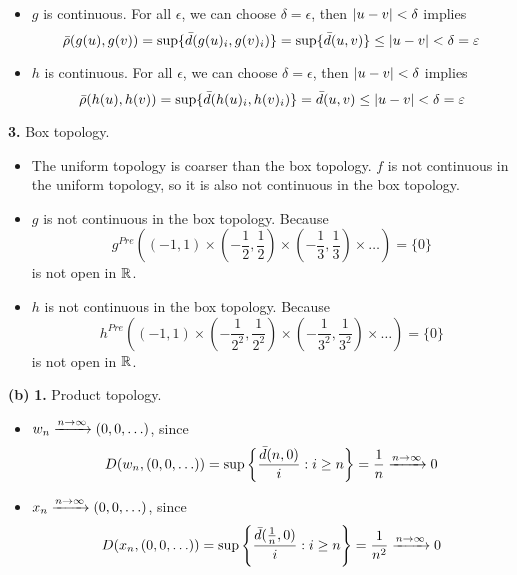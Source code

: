 \documentclass[a4paper, 12pt]{article}
\begin{document}
\begin{solution}
\begin{itemize}
\item $g$ is continuous. For all $\epsilon$, we can choose $\delta = \epsilon$, then $\lvert u - v\rvert < \delta$ implies \begin{equation*}
\bar{\rho}(g(u), g(v)) = \sup\{\bar{d} (g(u)_i, g(v)_i)\}  = \sup\{\bar{d} (u, v)\} \leq \lvert u - v\rvert < \delta = \varepsilon 
\end{equation*}

 \item $h$ is continuous. For all $\epsilon$, we can choose $\delta = \epsilon$, then $\lvert u - v\rvert < \delta$ implies \begin{equation*}
    \bar{\rho}(h(u), h(v)) = \sup\{\bar{d} (h(u)_i, h(v)_i)\}  = \bar{d} (u, v) \leq \lvert u - v\rvert < \delta = \varepsilon 
    \end{equation*}
\end{itemize}

\textbf{3.} Box topology.
\begin{itemize}
\item The uniform topology is coarser than the box topology. $f$ is not continuous in the uniform topology, so it is also not continuous in the box topology.
\item $g$ is not continuous in the box topology. Because \begin{equation*}
g^{Pre}\left((-1, 1) \times \left(-\frac{1}{2}, \frac{1}{2}\right) \times \left(-\frac{1}{3}, \frac{1}{3}\right) \times \ldots \right) = \{0\}
\end{equation*}
is not open in $\mathbb{R}$.
\item $h$ is not continuous in the box topology. Because \begin{equation*}
h^{Pre}\left((-1, 1) \times \left(-\frac{1}{2^2}, \frac{1}{2^2}\right) \times \left(-\frac{1}{3^2}, \frac{1}{3^2}\right) \times \ldots \right) = \{0\}
\end{equation*}
is not open in $\mathbb{R}$.
\end{itemize}
\textbf{(b)}
\textbf{1.} Product topology.
\begin{itemize}
\item $w_n \xrightarrow{n \to \infty} (0, 0, \ldots)$, since \begin{equation*}
D(w_n, (0, 0, \ldots)) = \sup\left\{\frac{\bar{d}(n, 0)}{i} : i \geq n\right\} = \frac{1}{n} \xrightarrow{n \to \infty} 0
\end{equation*}
\item $x_n \xrightarrow{n \to \infty} (0, 0, \ldots)$, since \begin{equation*}
    D(x_n, (0, 0, \ldots)) = \sup\left\{\frac{\bar{d}(\frac{1}{n}, 0)}{i} : i \geq n\right\} = \frac{1}{n^2} \xrightarrow{n \to \infty} 0
    \end{equation*}


\end{itemize}
\end{solution}
\end{document}
